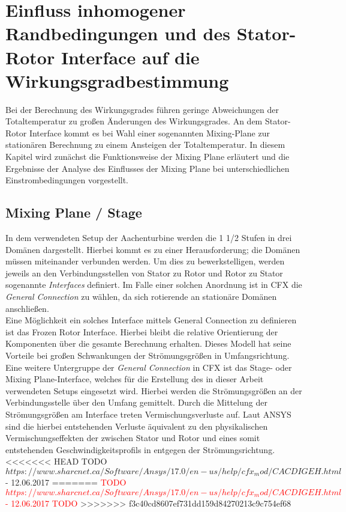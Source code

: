 \chapter{Einfluss inhomogener Randbedingungen und des Stator-Rotor Interface auf die Wirkungsgradbestimmung}
\label{cha:kanal}
Bei der Berechnung des Wirkungsgrades führen geringe Abweichungen der Totaltemperatur zu großen Änderungen des Wirkungsgrades. An dem Stator-Rotor Interface kommt es bei Wahl einer sogenannten Mixing-Plane zur stationären Berechnung zu einem Ansteigen der Totaltemperatur. In diesem Kapitel wird zunächst die Funktionsweise der Mixing Plane erläutert und die Ergebnisse der Analyse des Einflusses der Mixing Plane bei unterschiedlichen Einstrombedingungen vorgestellt.
\section{Mixing Plane / Stage}
In dem verwendeten Setup der Aachenturbine werden die 1 1/2 Stufen in drei Domänen dargestellt. Hierbei kommt es zu einer Herausforderung; die Domänen müssen miteinander verbunden werden. Um dies zu bewerkstelligen, werden jeweils an den Verbindungsstellen von Stator zu Rotor und Rotor zu Stator sogenannte \textit{Interfaces} definiert.
Im Falle einer solchen Anordnung ist in CFX die \textit{General Connection} zu wählen, da sich rotierende an stationäre Domänen anschließen.\\
Eine Möglichkeit ein solches Interface mittels General Connection zu definieren ist das Frozen Rotor Interface. Hierbei bleibt die relative Orientierung der Komponenten über die gesamte Berechnung erhalten. 
Dieses Modell hat seine Vorteile bei großen Schwankungen der Strömungsgrößen in Umfangsrichtung.\\
Eine weitere Untergruppe der \textit{General Connection} in CFX ist das Stage- oder Mixing Plane-Interface, welches für die Erstellung des in dieser Arbeit verwendeten Setups eingesetzt wird. Hierbei werden die Strömungsgrößen an der Verbindungsstelle über den Umfang gemittelt.
Durch die Mittelung der Strömungsgrößen am Interface treten Vermischungsverluste auf. Laut ANSYS sind die hierbei entstehenden Verluste äquivalent zu den physikalischen Vermischungseffekten der zwischen Stator und Rotor und eines somit entstehenden Geschwindigkeitsprofils in entgegen der Strömungsrichtung.\\
<<<<<<< HEAD
TODO ${https://www.sharcnet.ca/Software/Ansys/17.0/en-us/help/cfx_mod/CACDIGEH.html} $- 12.06.2017 %
=======
\textcolor{red}{TODO ${https://www.sharcnet.ca/Software/Ansys/17.0/en-us/help/cfx_mod/CACDIGEH.html} $- 12.06.2017 TODO}
>>>>>>> f3c40cd8607ef731dd159d84270213c9c754ef68
